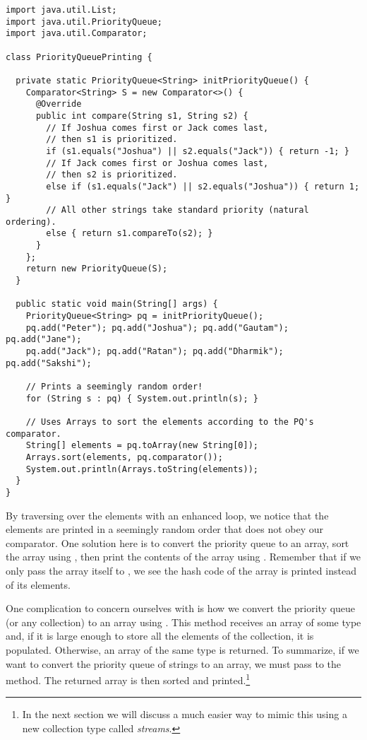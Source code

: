 \begin{lstlisting}[language=MyJava]
import java.util.List;
import java.util.PriorityQueue;
import java.util.Comparator;

class PriorityQueuePrinting {

  private static PriorityQueue<String> initPriorityQueue() {
    Comparator<String> S = new Comparator<>() {
      @Override
      public int compare(String s1, String s2) {
        // If Joshua comes first or Jack comes last, 
        // then s1 is prioritized.
        if (s1.equals("Joshua") || s2.equals("Jack")) { return -1; } 
        // If Jack comes first or Joshua comes last, 
        // then s2 is prioritized.
        else if (s1.equals("Jack") || s2.equals("Joshua")) { return 1; } 
        // All other strings take standard priority (natural ordering).
        else { return s1.compareTo(s2); }
      }
    };
    return new PriorityQueue(S);
  }

  public static void main(String[] args) {
    PriorityQueue<String> pq = initPriorityQueue();
    pq.add("Peter"); pq.add("Joshua"); pq.add("Gautam"); pq.add("Jane");
    pq.add("Jack"); pq.add("Ratan"); pq.add("Dharmik"); pq.add("Sakshi");

    // Prints a seemingly random order!
    for (String s : pq) { System.out.println(s); }

    // Uses Arrays to sort the elements according to the PQ's comparator.
    String[] elements = pq.toArray(new String[0]);
    Arrays.sort(elements, pq.comparator());
    System.out.println(Arrays.toString(elements));
  }
}
\end{lstlisting}

By traversing over the elements with an enhanced  loop, we notice that the elements are printed in a seemingly random order that does not obey our comparator. One solution here is to convert the priority queue to an array, sort the array using , then print the contents of the array using . Remember that if we only pass the array itself to , we see the hash code of the array is printed instead of its elements. 

One complication to concern ourselves with is how we convert the priority queue (or any collection) to an array using . This method receives an array of some type  and, if it is large enough to store all the elements of the collection, it is populated. Otherwise, an array of the same type  is returned. To summarize, if we want to convert the priority queue of strings to an array, we must pass  to the  method. The returned array is then sorted and printed.\footnote{In the next section we will discuss a much easier way to mimic this using a new collection type called \emph{streams}.} 

